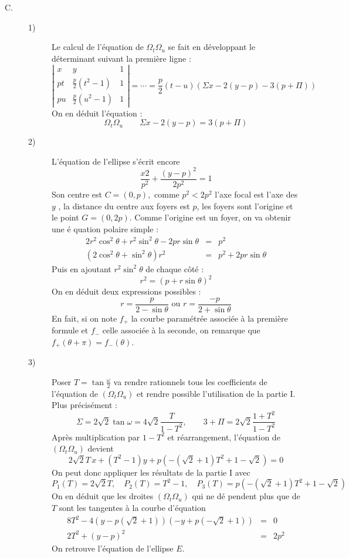 \begin{description}
\item[C.] 
\begin{description}
\item[1)]  Le calcul de l'\'{e}quation de $\Omega _{t}\Omega _{u}$ se fait
en d\'{e}veloppant le d\'{e}terminant suivant la premi\`{e}re ligne :
\[
\left| 
\begin{array}{ccc}
x & y & 1 \\ 
pt & \frac{p}{2}(t^{2}-1) & 1 \\ 
pu & \frac{p}{2}(u^{2}-1) & 1
\end{array}
\right| =\cdots =\frac{p}{2}(t-u)\left( \Sigma x-2(y-p)-3(p+\Pi )\right) 
\]
On en d\'{e}duit l'\'{e}quation :
\[
\Omega _{t}\Omega _{u}\qquad \Sigma x-2(y-p)=3(p+\Pi )
\]

\item[2)]  L'\'{e}quation de l'ellipse s'\'{e}crit encore 
\[
\frac{x2}{p^{2}}+\frac{(y-p)^{2}}{2p^{2}}=1
\]
Son centre est $C=(0,p),$ comme $p^{2}<2p^{2}$ l'axe focal est l'axe des $y$%
, la distance du centre aux foyers est $p$, les foyers sont l'origine et le
point $G=(0,2p)$. Comme l'origine est un foyer, on va obtenir une \'{e}%
quation polaire simple :
\begin{eqnarray*}
2r^{2}\cos ^{2}\theta +r^{2}\sin ^{2}\theta -2pr\sin \theta  &=&p^{2} \\
(2\cos ^{2}\theta +\sin ^{2}\theta )r^{2} &=&p^{2}+2pr\sin \theta 
\end{eqnarray*}
Puis en ajoutant $r^{2}\sin ^{2}\theta $ de chaque c\^{o}t\'{e} :
\[
r^{2}=(p+r\sin \theta )^{2}
\]
On en d\'{e}duit deux expressions possibles :
\[
r=\frac{p}{2-\sin \theta }\text{ ou }r=\frac{-p}{2+\sin \theta }
\]
En fait, si on note $f_{+}$ la courbe param\'{e}tr\'{e}e associ\'{e}e \`{a}
la premi\`{e}re formule et $f_{-}$ celle associ\'{e}e \`{a} la seconde, on
remarque que $f_{+}(\theta +\pi )=f_{-}(\theta )$.

\item[3)]  Poser $T=\tan \frac{\omega }{2}$ va rendre rationnels tous les
coefficients de l'\'{e}quation de $(\Omega _{t}\Omega _{u})$ et rendre
possible l'utilisation de la partie I. Plus pr\'{e}cis\'{e}ment :
\[
\Sigma =2\sqrt{2}\tan \omega =4\sqrt{2}\frac{T}{1-T^{2}},\qquad 3+\Pi =2%
\sqrt{2}\frac{1+T^{2}}{1-T^{2}}
\]
Apr\`{e}s multiplication par $1-T^{2}$ et r\'{e}arrangement, l'\'{e}quation
de $(\Omega _{t}\Omega _{u})$ devient 
\[
2\sqrt{2}T\,x+(T^{2}-1)y+p\left( -(\sqrt{2}+1)T^{2}+1-\sqrt{2}\right) =0
\]
On peut donc appliquer les r\'{e}sultats de la partie I avec 
\[
P_{1}(T)=2\sqrt{2}T,\quad P_{2}(T)=T^{2}-1,\quad P_{3}(T)=p\left( -(\sqrt{2}%
+1)T^{2}+1-\sqrt{2}\right) 
\]
On en d\'{e}duit que les droites $(\Omega _{t}\Omega _{u})$ qui ne d\'{e}%
pendent plus que de $T$ sont les tangentes \`{a} la courbe d'\'{e}quation 
\begin{eqnarray*}
8T^{2}-4(y-p(\sqrt{2}+1))(-y+p(-\sqrt{2}+1)) &=&0 \\
2T^{2}+(y-p)^{2} &=&2p^{2}
\end{eqnarray*}
On retrouve l'\'{e}quation de l'ellipse $E$.


\end{description}
\end{description}
